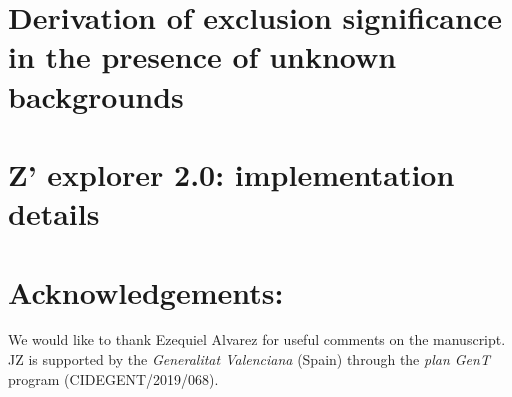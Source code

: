 \documentclass[11pt,a4paper]{article}
\begin{document}
\begin{appendix}
 \section{Derivation of exclusion significance in the presence of unknown backgrounds}
 \label{app:statistics}
 
 \section{Z' explorer 2.0: implementation details}
 \label{app:statistics}
 

\end{appendix}


\section*{Acknowledgements:} 

We would like to thank Ezequiel Alvarez for useful comments on the manuscript.  JZ is supported by the {\it Generalitat Valenciana} (Spain) through the {\it plan GenT} program (CIDEGENT/2019/068).




\end{document}
